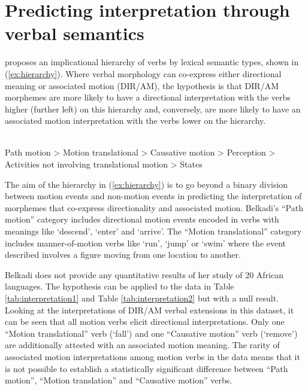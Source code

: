 \section{Predicting interpretation through verbal semantics}

\citet{belkadiAssociatedMotionConstructions2016,belkadiDeicticDirectionalityAssociated2021} proposes an implicational hierarchy of verbs by lexical semantic types, shown in (\ref{ex:hierarchy}). Where verbal morphology can co-express either directional meaning or associated motion (DIR/AM), the hypothesis is that DIR/AM morphemes are more likely to have a directional interpretation with the verbs higher (further left) on this hierarchy and, conversely, are more likely to have an associated motion interpretation with the verbs lower on the hierarchy. 

\ea {} \label{ex:hierarchy} \\
Path motion > Motion translational > Causative motion > Perception >  Activities not involving translational motion > States 
\z 

The aim of the hierarchy in (\ref{ex:hierarchy}) is to go beyond a binary division between motion events and non-motion events in predicting the interpretation of morphemes that co-express directionality and associated motion. Belkadi's ``Path motion'' category includes directional motion events encoded in verbs with meanings like `descend', `enter' and `arrive'. The ``Motion translational'' category includes manner-of-motion verbs like `run', `jump' or `swim' where the event described involves a figure moving from one location to another. 

Belkadi does not provide any quantitative results of her study of 20 African languages. The hypothesis can be applied to the data in Table \ref{tab:interpretation1} and Table \ref{tab:interpretation2} but with a null result. Looking at the interpretations of DIR/AM verbal extensions in this dataset, it can be seen that all motion verbs elicit directional interpretations. Only one ``Motion translational'' verb (`fall') and one ``Causative motion'' verb (`remove') are additionally attested with an associated motion meaning. The rarity of associated motion interpretations among motion verbs in the data means that it is not possible to establish a statistically significant difference between ``Path motion'', ``Motion translation'' and ``Causative motion'' verbs. 

